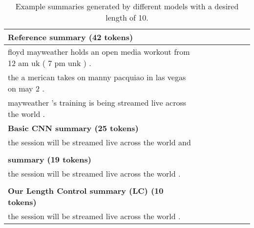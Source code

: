 \begin{table}[th!]
\begin{center}
\caption{\label{tab:existing-example} Example summaries generated by
different models with a desired length of 10.}
\small
\begin{tabular}{lclclclc}%
\hline \bf Reference summary (42 tokens) \\
\hline floyd mayweather holds an open media workout from 12 am uk ( 7 pm unk ) .\\
       the a merican takes on manny pacquiao in las vegas  on may 2 . \\
       mayweather 's training is being streamed live across the world . \\
\hline \bf Basic CNN summary (25 tokens)\\
\hline the session will be streamed live across the world and \color{red}{you can watch it .}\\
       \color{red}{the session will be streamed live across the world .} \\
\hline \bf \cite{abs-1711-05217} summary (19 tokens) \\
\hline the session will be streamed live across the world . \\
       \color{red}{it will be streamed live across the world .} \\
\hline \bf  Our Length Control summary (LC) (10 tokens)\\
\hline the session will be streamed live across the world . \\
\hline
\end{tabular}
\end{center}
\end{table}

